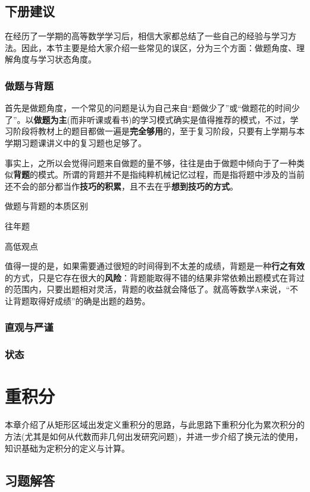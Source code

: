 \documentclass[a4paper,UTF8,fontset=windows,AutoFakeBold]{ctexart}
\newcommand*{\note}{\noindent *}
\theoremstyle{ex}
\begin{document}
\subsection{下册建议}
在经历了一学期的高等数学学习后，相信大家都总结了一些自己的经验与学习方法。因此，本节主要是给大家介绍一些常见的误区，分为三个方面：做题角度、理解角度与学习状态角度。

\subsubsection{做题与背题}
首先是做题角度，一个常见的问题是认为自己来自``题做少了''或``做题花的时间少了''。以\textbf{做题为主}(而非听课或看书)的学习模式确实是值得推荐的模式，不过，学习阶段将教材上的题目都做一遍是\textbf{完全够用}的，至于复习阶段，只要有上学期与本学期习题课讲义中的复习题也足够了。

事实上，之所以会觉得问题来自做题的量不够，往往是由于做题中倾向于了一种类似\textbf{背题}的模式。所谓的背题并不是指纯粹机械记忆过程，而是指将题中涉及的当前还不会的部分都当作\textbf{技巧的积累}，且不去在乎\textbf{想到技巧的方式}。

做题与背题的本质区别

往年题

高低观点

\note 值得一提的是，如果需要通过很短的时间得到不太差的成绩，背题是一种\textbf{行之有效}的方式，只是它存在很大的\textbf{风险}：背题能取得不错的结果非常依赖出题模式在背过的范围内，只要出题相对灵活，背题的收益就会降低了。就高等数学A来说，``不让背题取得好成绩''的确是出题的趋势。

\subsubsection{直观与严谨}
\subsubsection{状态}

\newpage
\section{重积分}
本章介绍了从矩形区域出发定义重积分的思路，与此思路下重积分化为累次积分的方法(尤其是如何从代数而非几何出发研究问题)，并进一步介绍了换元法的使用，知识基础为定积分的定义与计算。

\subsection{习题解答}
\end{document}
